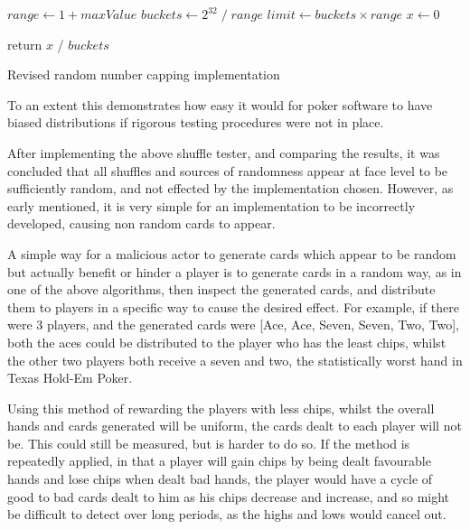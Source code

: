 \vspace{0.3cm}

\begin{algorithm}[H]
    \BlankLine{}
     $range \leftarrow 1 + maxValue$\;
     $buckets \leftarrow {2}^{32}\; / \;range$\;
     $limit \leftarrow buckets \times range$\;
     $x \leftarrow 0$\;

     

     return $x$ / $buckets$\;
\caption{Revised random number capping implementation}%
\label{code:rngGoodCapping}
\end{algorithm}

\vspace{0.3cm}

To an extent this demonstrates how easy it would for poker software to have
biased distributions if rigorous testing procedures were not in place.

After implementing the above shuffle tester, and comparing the results,
it was concluded that all shuffles and sources of randomness appear at face
level to be sufficiently random, and not effected by the implementation chosen.
However, as early mentioned, it is very simple for an implementation to be
incorrectly developed, causing non random cards to appear.

A simple way for a malicious actor to generate cards which appear to be random
but actually benefit or hinder a player is to generate cards in a random
way, as in one of the above algorithms, then inspect the generated cards,
and distribute them to players in a specific way to cause the desired effect.
For example, if there were 3 players, and the generated cards were
[Ace, Ace, Seven, Seven, Two, Two], both the aces could be distributed to
the player who has the least chips, whilst the other two players both receive
a seven and two, the statistically worst hand in Texas Hold-Em Poker.

Using this method of rewarding the players with less chips, whilst the overall 
hands and cards generated will be uniform, the cards dealt to each player 
will not be. This could still be measured, but is harder to do so. If the
method is repeatedly applied, in that a player will gain chips by being dealt 
favourable hands and lose chips when dealt bad hands, the player would have 
a cycle of good to bad cards dealt to him as his chips decrease and increase, 
and so might be difficult to detect over long periods, as the highs and lows 
would cancel out.

